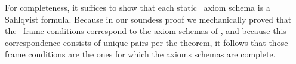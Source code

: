 For completeness, it suffices to show that each static \DASL\ axiom schema is a Sahlqvist formula. Because in our soundess proof we mechanically proved that the \DASL\ frame conditions correspond to the axiom schemas of \DASL, and because this correspondence consists of unique pairs per the theorem, it follows that those frame conditions are the ones for which the axioms schemas are complete.



